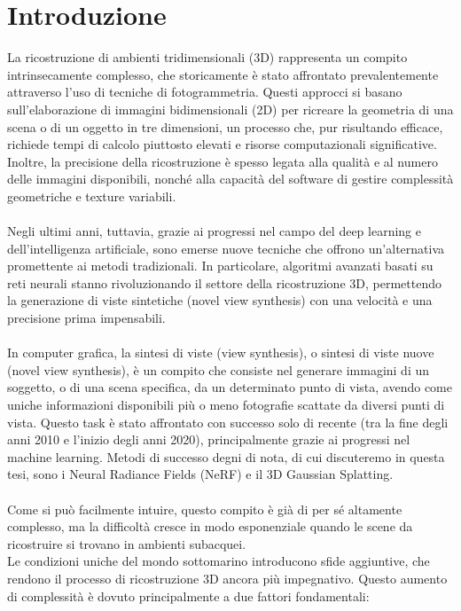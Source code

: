\chapter{Introduzione}
La ricostruzione di ambienti tridimensionali (3D) rappresenta un compito intrinsecamente complesso, che storicamente è stato affrontato prevalentemente attraverso l’uso di tecniche di fotogrammetria. Questi approcci si basano sull’elaborazione di immagini bidimensionali (2D) per ricreare la geometria di una scena o di un oggetto in tre dimensioni, un processo che, pur risultando efficace, richiede tempi di calcolo piuttosto elevati e risorse computazionali significative. Inoltre, la precisione della ricostruzione è spesso legata alla qualità e al numero delle immagini disponibili, nonché alla capacità del software di gestire complessità geometriche e texture variabili.
\\\\
Negli ultimi anni, tuttavia, grazie ai progressi nel campo del deep learning e dell’intelligenza artificiale, sono emerse nuove tecniche che offrono un’alternativa promettente ai metodi tradizionali. In particolare, algoritmi avanzati basati su reti neurali stanno rivoluzionando il settore della ricostruzione 3D, permettendo la generazione di viste sintetiche (novel view synthesis) con una velocità e una precisione prima impensabili.
\\\\
In computer grafica, la sintesi di viste (view synthesis), o sintesi di viste nuove (novel view synthesis), è un compito che consiste nel generare immagini di un soggetto, o di una scena specifica, da un determinato punto di vista, avendo come uniche informazioni disponibili più o meno fotografie scattate da diversi punti di vista.
Questo task è stato affrontato con successo solo di recente (tra la fine degli anni 2010 e l’inizio degli anni 2020), principalmente grazie ai progressi nel machine learning. Metodi di successo degni di nota, di cui discuteremo in questa tesi, sono i Neural Radiance Fields (NeRF) e il 3D Gaussian Splatting.
\\\\
Come si può facilmente intuire, questo compito è già di per sé altamente complesso, ma la difficoltà cresce in modo esponenziale quando le scene da ricostruire si trovano in ambienti subacquei. \\
Le condizioni uniche del mondo sottomarino introducono sfide aggiuntive, che rendono il processo di ricostruzione 3D ancora più impegnativo. Questo aumento di complessità è dovuto principalmente a due fattori fondamentali:

